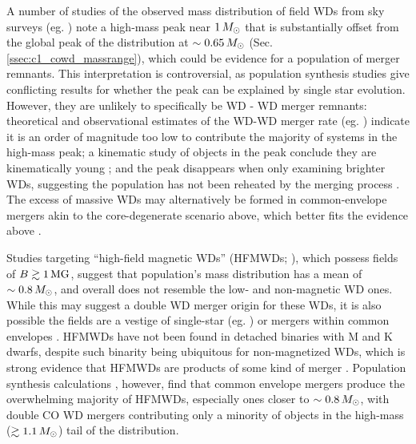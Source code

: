 
A number of studies of the observed mass distribution of field WDs from sky surveys (eg. \citealt{liebbh05, giambd12, klei+13, reba+15a, reba+15b}) note a high-mass peak near $1\,\Msun$ that is substantially offset from the global peak of the distribution at $\sim0.65\,\Msun$ (Sec. \ref{ssec:c1_cowd_massrange}), which could be evidence for a population of merger remnants.  This interpretation is controversial, as population synthesis studies \citep{reba+15a, trem+16} give conflicting results for whether the peak can be explained by single star evolution.  However, they are unlikely to specifically be WD - WD merger remnants: theoretical and observational estimates of the WD-WD merger rate (eg. \citealt{badem12, toonnp12}) indicate it is an order of magnitude too low \citep{trem+16} to contribute the majority of systems in the high-mass peak; a kinematic study of objects in the peak conclude they are kinematically young \citep{weggp12}; and the peak disappears when only examining brighter WDs, suggesting the population has not been reheated by the merging process \citep{reba+15b}.  The excess of massive WDs may alternatively be formed in common-envelope mergers akin to the core-degenerate scenario above, which better fits the evidence above \citep{reba+15b, brig+15}.


Studies targeting ``high-field magnetic WDs'' (HFMWDs; \citealt{kepl+13, garc+16}), which possess fields of $B \gtrsim1\,\mathrm{MG}$, suggest that population's mass distribution has a mean of $\sim0.8\,\Msun$, and overall does not resemble the low- and non-magnetic WD ones.  While this may suggest a double WD merger origin for these WDs, it is also possible the fields are a vestige of single-star (eg. \citealt{wickf05, kisst15}) or mergers within common envelopes \citep{garc+12, wicktf14, brig+15}.  HFMWDs have not been found in detached binaries with M and K dwarfs, despite such binarity being ubiquitous for non-magnetized WDs, which is strong evidence that HFMWDs are products of some kind of merger \citep{lieb+15, ferrdg15}.  Population synthesis calculations \citep{garc+12, brig+15}, however, find that common envelope mergers produce the overwhelming majority of HFMWDs, especially ones closer to $\sim0.8\,\Msun$, with double CO WD mergers contributing only a minority of objects in the high-mass ($\gtrsim1.1\,\Msun$) tail of the distribution.

